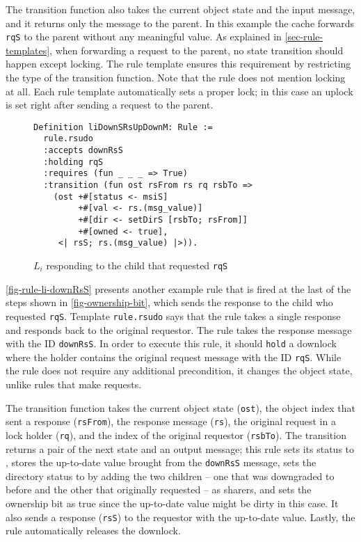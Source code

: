 \documentclass[sigplan,10pt,review,anonymous,screen]{acmart}\settopmatter{printfolios=true,printccs=false,printacmref=false}
\def\slstinline{\lstinline[basicstyle=\ttfamily\small]}
\begin{document}
The transition function also takes the current object state and the input message, and it returns only the message to the parent.
In this example the cache forwards \slstinline{rqS} to the parent without any meaningful value.
As explained in \autoref{sec-rule-templates}, when forwarding a request to the parent, no state transition should happen except locking.
The rule template ensures this requirement by restricting the type of the transition function.
Note that the rule does not mention locking at all.
Each rule template automatically sets a proper lock; in this case an uplock is set right after sending a request to the parent.

\begin{figure}[h]
  \centering
\begin{lstlisting}
Definition liDownSRsUpDownM: Rule :=
  rule.rsudo
  :accepts downRsS
  :holding rqS
  :requires (fun _ _ _ => True)
  :transition (fun ost rsFrom rs rq rsbTo =>
    (ost +#[status <- msiS]
         +#[val <- rs.(msg_value)]
         +#[dir <- setDirS [rsbTo; rsFrom]]
         +#[owned <- true],
     <| rsS; rs.(msg_value) |>)).
\end{lstlisting}
  \caption{$L_i$ responding to the child that requested \slstinline{rqS}}
  \label{fig-rule-li-downRsS}
\end{figure}

\autoref{fig-rule-li-downRsS} presents another example rule that is fired at the last of the steps shown in \autoref{fig-ownership-bit}, which sends the response to the child who requested \slstinline{rqS}.
Template \slstinline{rule.rsudo} says that the rule takes a single response and responds back to the original requestor.
The rule takes the response message with the ID \slstinline{downRsS}.
In order to execute this rule, it should \slstinline{hold} a downlock where the holder contains the original request message with the ID \slstinline{rqS}.
While the rule does not require any additional precondition, it changes the object state, unlike rules that make requests.

The transition function takes the current object state (\slstinline{ost}), the object index that sent a response (\slstinline{rsFrom}), the response message (\slstinline{rs}), the original request in a lock holder (\slstinline{rq}), and the index of the original requestor (\slstinline{rsbTo}).
The transition returns a pair of the next state and an output message; this rule sets its status to \stS{}, stores the up-to-date value brought from the \slstinline{downRsS} message, sets the directory status to \stS{} by adding the two children -- one that was downgraded to \stS{} before and the other that originally requested \stS{} -- as sharers, and sets the ownership bit as true since the up-to-date value might be dirty in this case.
It also sends a response (\slstinline{rsS}) to the requestor with the up-to-date value. Lastly, the rule automatically releases the downlock.
\end{document}
